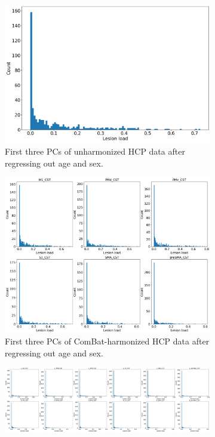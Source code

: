 \documentclass[10pt]{article}
\begin{document}
\begin{figure}
\begin{subfigure}{0.5\textwidth}
  \centering
  \includegraphics[width=1\linewidth]{figures/m1_lesionload.png}
  \caption{First three PCs of unharmonized HCP data after regressing out age and sex.}
  \label{fig:sfig1}
\end{subfigure}
\begin{subfigure}{0.5\textwidth}
  \centering
  \includegraphics[width=1\linewidth]{figures/all_lesionload.png}
  \caption{First three PCs of ComBat-harmonized HCP data after regressing out age and sex.}
  \label{fig:sfig2}
\end{subfigure}
\begin{subfigure}{1\textwidth}
  \centering
  \includegraphics[width=1\linewidth]{figures/all2h_lesionload.png}

\end{subfigure}
\end{figure}
\end{document}

